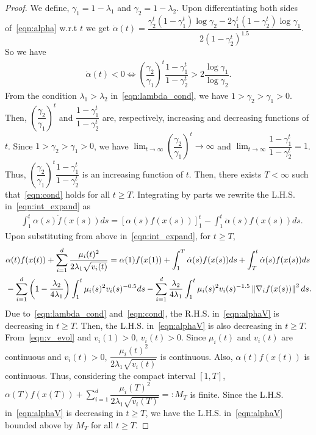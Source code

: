 \begin{proof}
We define, $\gamma_1 = 1-\lambda_1$ and $\gamma_2 = 1-\lambda_2$.
Upon differentiating both sides of~\eqref{eqn:alpha} w.r.t $t$ we get $\Dot{\alpha}(t) = \dfrac{\gamma_2^t(1-\gamma_1^t)\log{\gamma_2} - 2\gamma_1^t(1-\gamma_2^t)\log{\gamma_1}}{2(1-\gamma_2^t)^{1.5}}$.
So we have
\begin{align}
    \Dot{\alpha}(t) < 0 \iff \left(\dfrac{\gamma_2}{\gamma_1}\right)^t \dfrac{1-\gamma_1^t}{1-\gamma_2^t} > 2\dfrac{\log{\gamma_1}}{\log{\gamma_2}}. \label{eqn:cond}
\end{align}
From the condition $\lambda_1 > \lambda_2$ in~\eqref{eqn:lambda_cond}, we have $1 > \gamma_2 > \gamma_1 > 0$. Then, $\left(\dfrac{\gamma_2}{\gamma_1}\right)^t$ and $\dfrac{1-\gamma_1^t}{1-\gamma_2^t}$ are, respectively, increasing and decreasing functions of $t$. Since $1 > \gamma_2 > \gamma_1 > 0$, we have $\lim_{t \to \infty} \left(\dfrac{\gamma_2}{\gamma_1}\right)^t \to \infty$ and $\lim_{t \to \infty} \dfrac{1-\gamma_1^t}{1-\gamma_2^t} = 1$. Thus, $\left(\dfrac{\gamma_2}{\gamma_1}\right)^t \dfrac{1-\gamma_1^t}{1-\gamma_2^t}$ is an increasing function of $t$. Then, there exists $T < \infty$ such that~\eqref{eqn:cond} holds for all $t \geq T$. 
Integrating by parts we rewrite the L.H.S. in~\eqref{eqn:int_expand} as
\begin{align*}
    & \int_1^t \alpha(s)\Dot{f}(x(s))ds = \left[\alpha(s)f(x(s))\right]_1^t - \int_1^t \Dot{\alpha}(s)f(x(s))ds.
\end{align*}
Upon substituting from above in~\eqref{eqn:int_expand}, for $t \geq T$,
\begin{align}
    & \alpha(t)f(x(t)) + \sum_{i=1}^d \dfrac{\mu_i(t)^2}{2\lambda_1\sqrt{v_i(t)}} = \alpha(1)f(x(1)) + \int_1^{T} \Dot{\alpha}(s)f(x(s))ds + \int_{T}^t \Dot{\alpha}(s)f(x(s))ds \nonumber \\
    & - \sum_{i=1}^d \left(1-\dfrac{\lambda_2}{4\lambda_1}\right)\int_1^t \mu_i(s)^2 v_i(s)^{-0.5} ds - \sum_{i=1}^d \dfrac{\lambda_2}{4\lambda_1}\int_1^t \mu_i(s)^2 v_i(s)^{-1.5} \left\lVert\nabla_i f(x(s))\right\rVert ^2 ds. \label{eqn:alphaV}
\end{align}
Due to~\eqref{eqn:lambda_cond} and~\eqref{eqn:cond}, the R.H.S. in~\eqref{eqn:alphaV} is decreasing in $t \geq T$. Then, the L.H.S. in~\eqref{eqn:alphaV} is also decreasing in $t \geq T$. From~\eqref{eqn:v_evol} and $v_i(1) > 0$, $v_i(t) > 0$. Since $\mu_i(t)$ and $v_i(t)$ are continuous and $v_i(t) > 0$, $\dfrac{\mu_i(t)^2}{2\lambda_1\sqrt{v_i(t)}}$ is continuous. Also, $\alpha(t)f(x(t))$ is continuous. Thus, considering the compact interval $[1,T]$, $\alpha(T)f(x(T)) + \sum_{i=1}^d \dfrac{\mu_i(T)^2}{2\lambda_1\sqrt{v_i(T)}} =: M_T$ is finite. Since the L.H.S. in~\eqref{eqn:alphaV} is decreasing in $t \geq T$, we have the L.H.S. in~\eqref{eqn:alphaV} bounded above by $M_T$ for all $t \geq T$. 


\end{proof}
